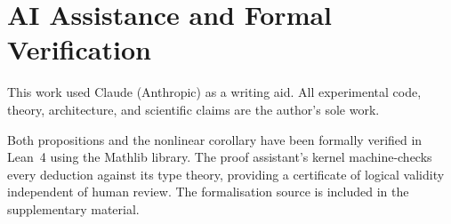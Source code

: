 \documentclass{article}
\begin{document}
\section{AI Assistance and Formal Verification}
\label{app:ai-disclosure}

This work used Claude (Anthropic) as a writing aid.  All
experimental code, theory, architecture, and scientific claims are
the author's sole work.

Both propositions and the nonlinear corollary have been formally
verified in Lean~4 using the Mathlib library.  The proof assistant's
kernel machine-checks every deduction against its type theory,
providing a certificate of logical validity independent of human
review.  The formalisation source is included in the supplementary
material.
\end{document}
